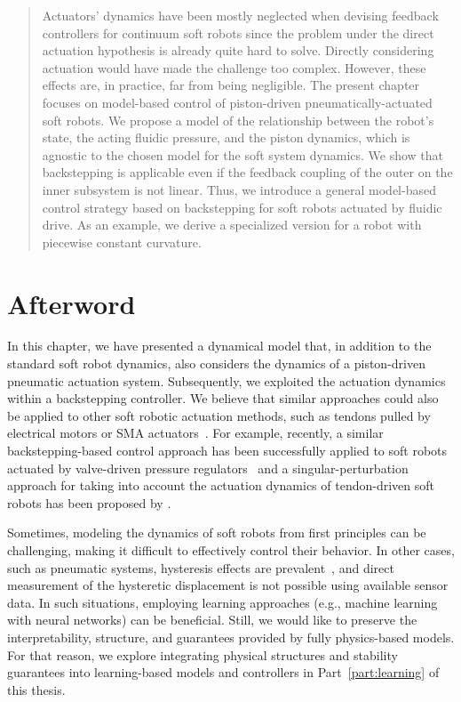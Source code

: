 \pagebreak

\begin{abstract}
    Actuators' dynamics have been mostly neglected when devising feedback controllers for continuum soft robots since the problem under the direct actuation hypothesis is already quite hard to solve. Directly considering actuation would have made the challenge too complex. However, these effects are, in practice, far from being negligible. The present chapter focuses on model-based control of piston-driven pneumatically-actuated soft robots. We propose a model of the relationship between the robot's state, the acting fluidic pressure, and the piston dynamics, which is agnostic to the chosen model for the soft system dynamics. 
    We show that backstepping is applicable even if the feedback coupling of the outer on the inner subsystem is not linear.
    Thus, we introduce a general model-based control strategy based on backstepping for soft robots actuated by fluidic drive. As an example, we derive a specialized version for a robot with piecewise constant curvature. 
\end{abstract}


\newpage








\section*{Afterword}
In this chapter, we have presented a dynamical model that, in addition to the standard soft robot dynamics, also considers the dynamics of a piston-driven pneumatic actuation system. Subsequently, we exploited the actuation dynamics within a backstepping controller.
We believe that similar approaches could also be applied to other soft robotic actuation methods, such as tendons pulled by electrical motors or \gls{SMA} actuators~\citep{zaidi2021actuation}.
For example, recently, a similar backstepping-based control approach has been successfully applied to soft robots actuated by valve-driven pressure regulators~\citep{franco2024model} and a singular-perturbation approach for taking into account the actuation dynamics of tendon-driven soft robots has been proposed by \citet{ribeiro2025singular}.

Sometimes, modeling the dynamics of soft robots from first principles can be challenging, making it difficult to effectively control their behavior. In other cases, such as pneumatic systems, hysteresis effects are prevalent~\citep{vo2010new}, and direct measurement of the hysteretic displacement is not possible using available sensor data.
In such situations, employing learning approaches (e.g., machine learning with neural networks) can be beneficial. Still, we would like to preserve the interpretability, structure, and guarantees provided by fully physics-based models. For that reason, we explore integrating physical structures and stability guarantees into learning-based models and controllers in Part~\ref{part:learning} of this thesis.
